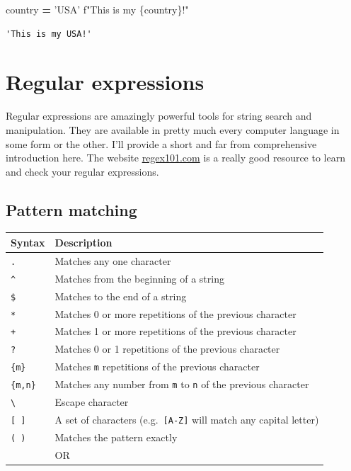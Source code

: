 \documentclass[
  letterpaper,
]{scrbook}
\newenvironment{Shaded}{\begin{snugshade}}{\end{snugshade}}
\newcommand{\NormalTok}[1]{#1}
\newcommand{\OperatorTok}[1]{\textcolor[rgb]{0.81,0.36,0.00}{\textbf{#1}}}
\newcommand{\SpecialCharTok}[1]{\textcolor[rgb]{0.00,0.00,0.00}{#1}}
\newcommand{\SpecialStringTok}[1]{\textcolor[rgb]{0.31,0.60,0.02}{#1}}
\newcommand{\StringTok}[1]{\textcolor[rgb]{0.31,0.60,0.02}{#1}}
\begin{document}
\begin{Shaded}
\begin{Highlighting}[]
\NormalTok{country }\OperatorTok{=} \StringTok{'USA'}
\SpecialStringTok{f"This is my }\SpecialCharTok{\{}\NormalTok{country}\SpecialCharTok{\}}\SpecialStringTok{!"}
\end{Highlighting}
\end{Shaded}

\begin{verbatim}
'This is my USA!'
\end{verbatim}

\hypertarget{regular-expressions}{%
\section{Regular expressions}\label{regular-expressions}}

Regular expressions are amazingly powerful tools for string search and manipulation. They are available in pretty much every
computer language in some form or the other. I'll provide a short and far from comprehensive introduction here. The website \href{https://regex101.com}{regex101.com} is a really good resource to learn and check your regular expressions.

\hypertarget{pattern-matching}{%
\subsection{Pattern matching}\label{pattern-matching}}

\begin{longtable}[]{@{}ll@{}}
\toprule
Syntax & Description\tabularnewline
\midrule
\endhead
\texttt{.} & Matches any one character\tabularnewline
\texttt{\^{}} & Matches from the beginning of a string\tabularnewline
\texttt{\$} & Matches to the end of a string\tabularnewline
\texttt{*} & Matches 0 or more repetitions of the previous character\tabularnewline
\texttt{+} & Matches 1 or more repetitions of the previous character\tabularnewline
\texttt{?} & Matches 0 or 1 repetitions of the previous character\tabularnewline
\texttt{\{m\}} & Matches \texttt{m} repetitions of the previous character\tabularnewline
\texttt{\{m,n\}} & Matches any number from \texttt{m} to \texttt{n} of the previous character\tabularnewline
\texttt{\textbackslash{}} & Escape character\tabularnewline
\texttt{{[}\ {]}} & A set of characters (e.g.~\texttt{{[}A-Z{]}} will match any capital letter)\tabularnewline
\texttt{(\ )} & Matches the pattern exactly\tabularnewline
\texttt{\textbar{}} & OR\tabularnewline
\bottomrule
\end{longtable}
\end{document}
